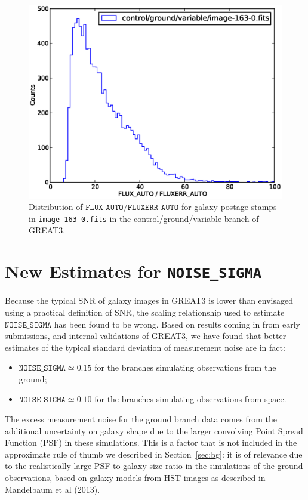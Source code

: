 \documentclass[preprint,11pt]{aastex}
\begin{document}
\begin{figure}\label{eq:snr}
\begin{center}
\includegraphics[width=\textwidth]{snr_cvg.eps}
\caption{Distribution of $\texttt{FLUX\_AUTO} /
  \texttt{FLUXERR\_AUTO}$ for galaxy postage stamps in
  \texttt{image-163-0.fits} in the control/ground/variable branch of GREAT3.}
\end{center}
\end{figure}

\section{New Estimates for \texttt{NOISE\_SIGMA}}\label{sec:ns}
Because the typical SNR of galaxy images in GREAT3 is lower than
envisaged using a practical definition of SNR, the scaling
relationship used to estimate $\texttt{NOISE\_SIGMA}$ has been found
to be wrong.   Based on results coming in from early submissions, and
internal validations of GREAT3, we have found that better estimates of
the typical standard deviation of measurement noise are in fact:
\begin{itemize}
\item[] $\texttt{NOISE\_SIGMA} \simeq 0.15$ for the branches simulating
  observations from the ground;
\item[] $\texttt{NOISE\_SIGMA} \simeq 0.10$ for the branches simulating
  observations from space.
\end{itemize}
The excess measurement noise for the ground branch data comes from the
additional uncertainty on galaxy shape due to the larger convolving
Point Spread Function (PSF) in these simulations.  This is a factor
that is not included in the approximate rule of thumb we described in
Section~\ref{sec:bg}: it is of relevance due to the realistically
large PSF-to-galaxy size ratio in the simulations of the ground
observations, based on galaxy models from HST images as described in
Mandelbaum et al (2013).
\end{document}

